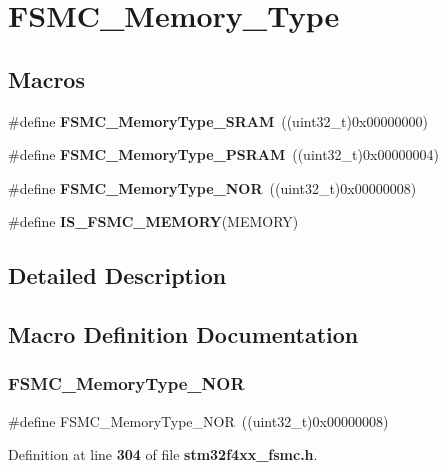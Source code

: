 \section{F\+S\+M\+C\+\_\+\+Memory\+\_\+\+Type}
\label{group__FSMC__Memory__Type}
\subsection*{Macros}
\begin{DoxyCompactItemize}
\item 
\#define \textbf{ F\+S\+M\+C\+\_\+\+Memory\+Type\+\_\+\+S\+R\+AM}~((uint32\+\_\+t)0x00000000)
\item 
\#define \textbf{ F\+S\+M\+C\+\_\+\+Memory\+Type\+\_\+\+P\+S\+R\+AM}~((uint32\+\_\+t)0x00000004)
\item 
\#define \textbf{ F\+S\+M\+C\+\_\+\+Memory\+Type\+\_\+\+N\+OR}~((uint32\+\_\+t)0x00000008)
\item 
\#define \textbf{ I\+S\+\_\+\+F\+S\+M\+C\+\_\+\+M\+E\+M\+O\+RY}(M\+E\+M\+O\+RY)
\end{DoxyCompactItemize}


\subsection{Detailed Description}


\subsection{Macro Definition Documentation}
\mbox{\label{group__FSMC__Memory__Type_ga8b9390abe7c281947c550bf4365649e5}} 
\subsubsection{F\+S\+M\+C\+\_\+\+Memory\+Type\+\_\+\+N\+OR}
{\footnotesize\ttfamily \#define F\+S\+M\+C\+\_\+\+Memory\+Type\+\_\+\+N\+OR~((uint32\+\_\+t)0x00000008)}



Definition at line \textbf{ 304} of file \textbf{ stm32f4xx\+\_\+fsmc.\+h}.

